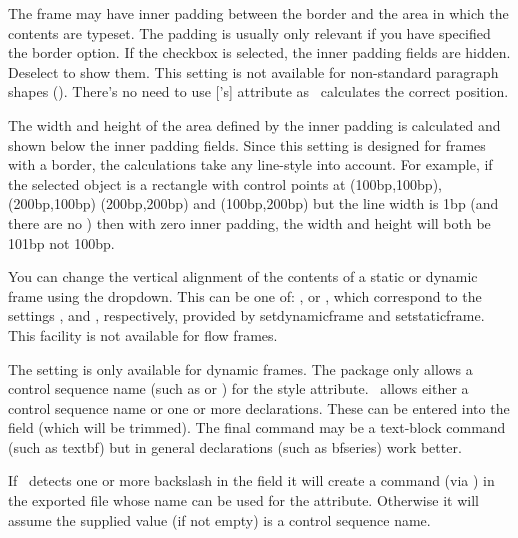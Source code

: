 
The frame may have inner padding between the border and the area in which
the contents are typeset. The padding is usually only relevant
if you have specified the 
border option. If the  checkbox
is selected, the inner padding fields are hidden. Deselect
 to show them.
This setting is not available for non-standard
paragraph shapes ().
There's no need to use ['s]  attribute
as \FlowframTk\ calculates the correct position.

The width and height of the area defined by the inner padding is
calculated and shown below the inner padding fields. Since this
setting is designed for frames with a border, the calculations take
any \gls{line-style} into account. For example, if the selected
object is a rectangle with control points at
(100\gls{bp},100\gls{bp}), (200\gls{bp},100\gls{bp})
(200\gls{bp},200\gls{bp}) and (100\gls{bp},200\gls{bp}) but the line
width is 1\gls{bp} (and there are no ) then with
zero inner padding, the width and height will both be 101\gls{bp}
not 100\gls{bp}.


You can change the vertical alignment of the contents of a static or
dynamic frame using the  \gls{dropdown}.
This can be one of: ,
 or ,
which correspond to the settings ,
 and ,
respectively, provided by \gls{setdynamicframe} and
\gls{setstaticframe}. This facility is not available for flow
frames.

The  setting is only available for
dynamic frames. The  package only allows a control
sequence name (such as  or ) for the style
attribute.  \FlowframTk\ allows either a control sequence name or
one or more declarations. These can be entered into the
 field (which will be trimmed).
The final command may be a text-block command (such as \gls{textbf})
but in general declarations (such as \gls{bfseries}) work better.

If \FlowframTk\ detects one or more backslash in the 
field it will create a command (via ) in the
exported file whose name can be used for the
 attribute. Otherwise it will assume the supplied
value (if not empty) is a control sequence name.

